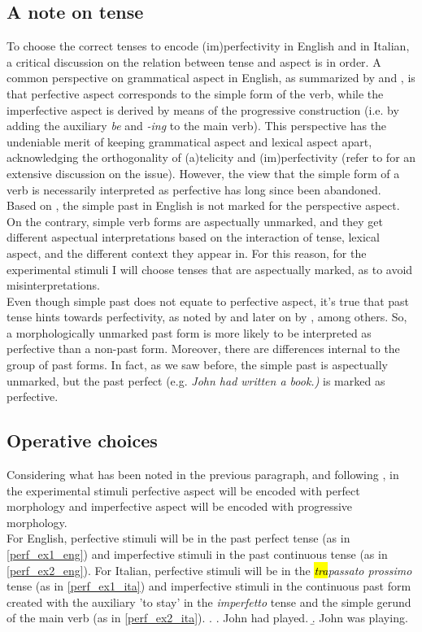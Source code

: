 \subsection{A note on tense}
To choose the correct tenses to encode (im)perfectivity in English and in Italian, a critical discussion on the relation between tense and aspect is in order. A common perspective on grammatical aspect in English, as summarized by \textcite[106]{smith1991parameter} and \textcite[663]{wagner2001aspectual}, is that perfective aspect corresponds to the simple form of the verb, while the imperfective aspect is derived by means of the progressive construction (i.e. by adding the auxiliary \textit{be} and \textit{-ing} to the main verb). This perspective has the undeniable merit of keeping grammatical aspect and lexical aspect apart, acknowledging the orthogonality of (a)telicity and (im)perfectivity (refer to \textcite{bertinetto2001frequent} for an extensive discussion on the issue). However, the view that the simple form of a verb is necessarily interpreted as perfective has long since been abandoned.\\
Based on \textcite{Olsen1997, bertinetto2001frequent}, the simple past in English is not marked for the perspective aspect. On the contrary, simple verb forms are aspectually unmarked, and they get different aspectual interpretations based on the interaction of tense, lexical aspect, and the different context they appear in. For this reason, for the experimental stimuli I will choose tenses that are aspectually marked, as to avoid misinterpretations.\\
Even though simple past does not equate to perfective aspect, it's true that past tense hints towards perfectivity, as noted by \textcite{comrie1976aspect} and later on by \textcite{wagner2001aspectual, Olsen1997, Medina2007}, among others. So, a morphologically unmarked past form is more likely to be interpreted as perfective than a non-past form. Moreover, there are differences internal to the group of past forms. In fact, as we saw before, the simple past is aspectually unmarked, but the past perfect (e.g. \textit{John had written a book.)} is marked as perfective.

\subsection{Operative choices}
Considering what has been noted in the previous paragraph, and following \textcite{Medina2007}, in the experimental stimuli perfective aspect will be encoded with perfect morphology and imperfective aspect will be encoded with progressive morphology.\\
For English, perfective stimuli will be in the past perfect tense (as in \ref{perf_ex1_eng}) and imperfective stimuli in the past continuous tense (as in \ref{perf_ex2_eng}). For Italian, perfective stimuli will be in the \textit{\hl{tra}passato prossimo} tense (as in \ref{perf_ex1_ita}) and imperfective stimuli in the continuous past form created with the auxiliary 'to stay' in the \textit{imperfetto} tense and the simple gerund of the main verb (as in \ref{perf_ex2_ita}). 
\ex.\label{perf_ex_eng} \a. John had played. \label{perf_ex1_eng} 
\b. John was playing. \label{perf_ex2_eng}

